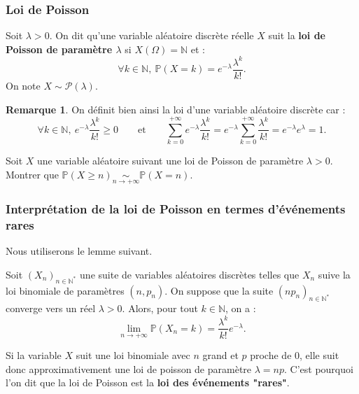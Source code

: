 \documentclass[french]{article}
\renewcommand{\P}{\mathbb{P}}
\newcommand{\N}{\mathbb{N}}
\newcommand{\st}{^*}
\theoremstyle{plain}
\theoremstyle{definition}
\newtheorem*{rmq}{Remarque}
\theoremstyle{remark}
\begin{document}
\subsubsection*{Loi de Poisson}

\begin{dfn}
	Soit $\lambda>0$. On dit qu'une variable aléatoire discrète réelle $X$ suit la \textbf{loi de Poisson de paramètre $\lambda$} si $X(\Omega)=\N$ et :
	$$\forall k\in\N,\ \P(X=k)=e^{-\lambda}\frac{\lambda^k}{k!}.$$
	On note $X\sim\mathcal{P}(\lambda)$.
\end{dfn}

\begin{rmq}
	On définit bien ainsi la loi d'une variable aléatoire discrète car :
	$$\forall k\in\N,\ e^{-\lambda}\frac{\lambda^k}{k!}\geqslant0\quad\quad\text{et}\quad\quad\sum_{k=0}^{+\infty}e^{-\lambda}\frac{\lambda^k}{k!}=e^{-\lambda}\sum_{k=0}^{+\infty}\frac{\lambda^k}{k!}=e^{-\lambda}e^{\lambda}=1.$$
\end{rmq}

\begin{exo}
	Soit $X$ une variable aléatoire suivant une loi de Poisson de paramètre $\lambda>0$.\\
	Montrer que $\P(X\geqslant n)\underset{n\to+\infty}{\sim}\P(X=n)$.
\end{exo}

\subsubsection*{Interprétation de la loi de Poisson en termes d'événements rares}

Nous utiliserons le lemme suivant.

\begin{lem}%
	Soit $(X_n)_{n\in\N\st}$ une suite de variables aléatoires discrètes telles que $X_n$ suive la loi binomiale de paramètres $(n,p_n)$. On suppose que la suite $(np_n)_{n\in\N\st}$ converge vers un réel $\lambda>0$. Alors, pour tout $k\in\N$, on a : $$\underset{n\to+\infty}{\lim}\P(X_n=k)=\frac{\lambda^k}{k!}e^{-\lambda}.$$
\end{lem}

Si la variable $X$ suit une loi binomiale avec $n$ grand et $p$ proche de $0$, elle suit donc approximativement une loi de poisson de paramètre $\lambda=np$. C'est pourquoi l'on dit que la loi de Poisson est la \textbf{loi des événements "rares"}.
\end{document}
